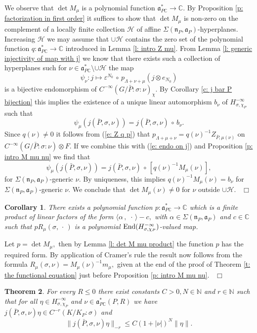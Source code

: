 \documentclass[12pt,a4paper]{article}
\newtheorem{Thm}{Theorem}
\newtheorem{Cor}[Thm]{Corollary}
\newenvironment{thm}[0]{\begin{Thm}\noindent}%
{\end{Thm}}
\newenvironment{cor}[0]{\begin{Cor}\noindent}%
{\end{Cor}}
\def\proof{\par\noindent{\it Proof.}{\ }{\ }}
\def\qed{~\hfill\hbox{$\Box$}\medbreak}
\def\msy#1{{\mathbb #1}}
\def\C{{\msy C}}
\def\N{{\msy N}}
\def\ga{\alpha}
\def\ge{\varepsilon}
\def\gs{\sigma}
\def\gS{\Sigma}
\def\got#1{\mathfrak #1}
\def\fa{{\got a}}
\def\fn{{\got n}}
\def\to{\rightarrow}
\def\inp#1#2{\langle#1\,,\,#2\rangle}
\def\End{{\rm End}}
\def\after{\,{\scriptstyle\circ}\,}
\def\iC{{\scriptscriptstyle \C}}
\def\cH{{\mathcal H}}
\numberwithin{Thm}{section}
\numberwithin{equation}{section}
\def\dotvar{\, \cdot\,}
\def\faPdc{{\fa_{P\iC}^*}}
\def\gL{\Lambda}
\numberwithin{equation}{section}
\def\gL{\Lambda}
\def\faPdc{\fa_{P\iC}^*}
\def\faP{\fa_P}
\def\cchi{\chi}
\def\gsP{\gs}%
\def\bfhyp{hyperplanes}
\begin{document}
%
\proof 
We observe that $\det M_\mu$ is a polynomial function $\faPdc \to \C.$ By Proposition \ref{p: factorization in first order} it suffices to show that $\det M_\mu$ is non-zero on the complement of a locally finite collection
$\cH$ of affine $\gS(\fn_P, \faP)$-hyperplanes. Increasing $\cH$ we may assume that 
$\cup \cH$ contains the zero set of the polynomial function $q: \faPdc \to 
\C$ introduced in Lemma \ref{l: intro Z mu}.
From Lemma \ref{l: generic injectivity of map with j}
we know that there exists such a collection of {\bfhyp} such for $\nu \in \faPdc\setminus \cup \cH$ 
the map 
\begin{equation}
\label{e: endo on j} 
\psi_\nu: j \mapsto \ge^{N_0} \after p_{\gL + \nu + \mu} (j \otimes e_{N_0} )
\end{equation}
is a bijective endomorphism of $C^{-\infty}(G/\bar P:\gs: \nu)_\cchi.$ 
By Corollary \ref{c: j bar P bijection} this implies the existence of a unique linear automorphism  
$b_\nu$ of $ H_{\gs,\cchi_P}^{-\infty}$ such that
$$ 
\psi_\mu(j(\bar P, \gs, \nu)) = j(\bar P, \gs,\nu) \after b_\nu.
$$ 
Since $q(\nu) \neq 0$ it follows from (\ref{e: Z q p}) 
that $p_{\gL + \mu +\nu} = q(\nu)^{-1} Z_{\bar P, \mu(\nu)}$ on $C^{-\infty}(G/\bar P: \gs :\nu)\otimes F.$ 
If we combine this with (\ref{e: endo on j}) and Proposition \ref{p: intro M mu nu} we find that 
$$ 
\psi_\mu(j(\bar P, \gs, \nu))  =  j(\bar P, \gs,\nu) \after [q(\nu)^{-1} M_\mu(\nu)],
$$ 
for $\gS(\fn_P,\fa_P)$-generic $\nu.$ By uniqueness, this implies $q(\nu)^{-1}M_\mu(\nu) = b_\nu $ 
for $\gS(\fn_P,\fa_P)$-generic $\nu.$ We conclude that $\det M_\mu(\nu) \neq 0$ for $\nu$ outside $\cup \cH.$ 
\qed

\begin{cor} There exists a polynomial function $p: \faPdc\to\C$ which is a finite product of linear factors of the form $\inp{\ga}{\dotvar} - c,$ with $\ga \in \gS(\fn_P, \faP)$ and $c \in \C$ 
such that $p R_\mu(\gs,\dotvar)$ is a polynomial $\End(H_{\gs,\cchi_P}^{-\infty})$-valued map.
\end{cor} 

\proof 
Let $p = \det M_\mu,$ then by Lemma \ref{l: det M mu product} the function $p$ has the required form.
By application of Cramer's rule the result now follows from the formula $R_\mu(\gs, \nu) = M_\mu(\nu)^{-1} m_\mu,$ 
given at the end of the proof of Theorem \ref{t: the functional equation} just before Proposition 
\ref{p: intro M mu nu}.
\qed

\begin{thm} 
\label{t: uniform estimate of j}
For every $R \leq 0$ there exist constants $C> 0, N \in \N$ and $r \in \N$ such that
for all $\eta \in H_{\gs,\cchi_P}^{-\infty}$ and $\nu \in \faPdc(P, R)$ we have  
$j(\bar P,\gs,\nu)\eta \in C^{-r}(K/K_P:\gsP)$ and 
$$ 
\|j(\bar P,\gs,\nu)\eta\|_{-r} \leq C (1 + |\nu|)^N \|\eta\|.
$$ 
\end{thm}
\end{document}
